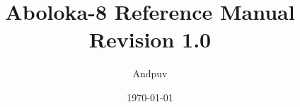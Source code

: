 \documentclass[a4paper,12pt]{book}
\begin{document}
\author{Andpuv}
\title{Aboloka-8 Reference Manual\\\large{Revision 1.0}}
\date{\today}

\frontmatter
\maketitle
\tableofcontents

\mainmatter

\backmatter

\end{document}
